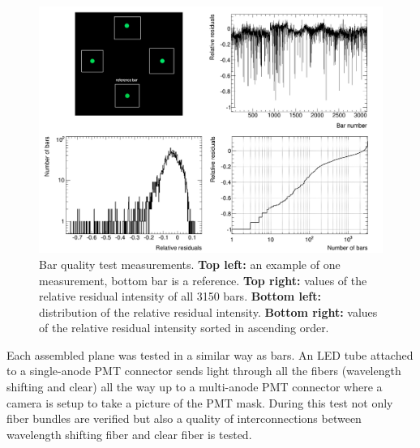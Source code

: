 \documentclass[a4paper,11pt]{article}
\begin{document}
\begin{figure}[htb]
 \centering
 \includegraphics[width=\textwidth]{./measurements}
 \caption[Bar quality test measurements]{Bar quality test measurements. {\bf Top left:} an example of one measurement, bottom bar is a reference. {\bf Top right:}
 values of the relative residual intensity of all 3150 bars. {\bf Bottom left:} distribution of the relative residual intensity. {\bf Bottom right:} values of the relative
 residual intensity sorted in ascending order.}
 \label{fig:measurements}
\end{figure}

Each assembled plane was tested in a similar way as bars. An LED tube attached to a single-anode PMT connector sends light through all the fibers (wavelength shifting and
clear) all the way up to a multi-anode PMT connector where a camera is setup to take a picture of the PMT mask.
During this test not only fiber bundles are verified but also a quality of interconnections between wavelength shifting fiber and clear fiber is tested.

\end{document}
